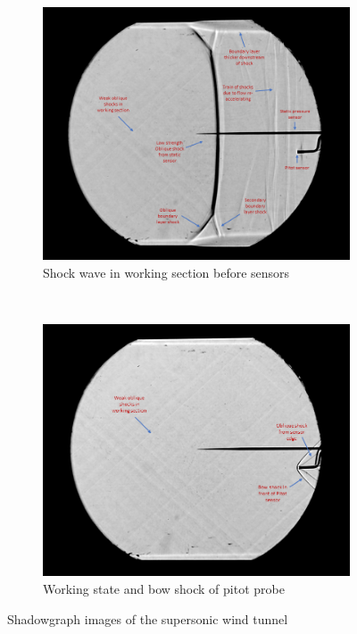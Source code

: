 \documentclass[8pt]{article}
\begin{document}
\begin{figure}[H]
    \centering
    \begin{subfigure}[t]{0.48\textwidth}
        \centering
        \includegraphics[width=1\textwidth]{shadowgraph_annotations/slide1.PNG}
        \caption{Shock wave in working section before sensors}

        \label{fig:figure6}
    \end{subfigure}
    ~
    \begin{subfigure}[t]{0.48\textwidth}
        \centering
        \includegraphics[width=1\textwidth]{shadowgraph_annotations/slide2.PNG}
        \caption{Working state and bow shock of pitot probe}
        \label{fig:figure7}
    \end{subfigure}
    \caption{Shadowgraph images of the supersonic wind tunnel}
\end{figure}
\end{document}
